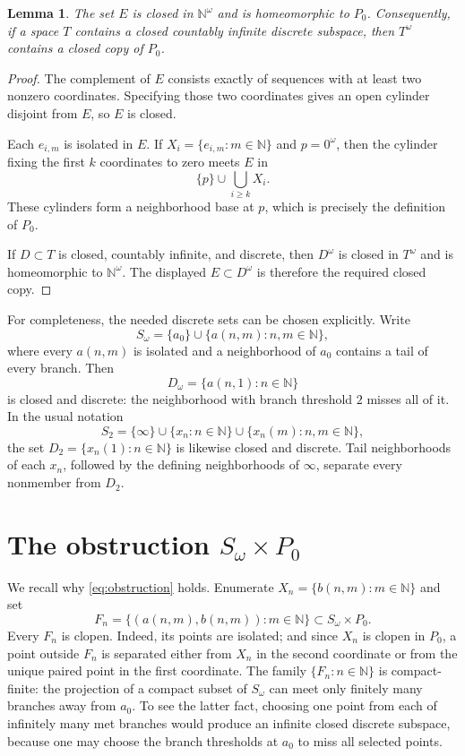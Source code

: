 \documentclass[11pt]{article}
\newtheorem{lemma}[theorem]{Lemma}
\newcommand{\N}{\mathbb N}
\begin{document}
\begin{lemma}\label{lem:P0}
The set $E$ is closed in $\N^\omega$ and is homeomorphic to $P_0$.
Consequently, if a space $T$ contains a closed countably infinite discrete
subspace, then $T^\omega$ contains a closed copy of $P_0$.
\end{lemma}

\begin{proof}
The complement of $E$ consists exactly of sequences with at least two
nonzero coordinates.  Specifying those two coordinates gives an open
cylinder disjoint from $E$, so $E$ is closed.

Each $e_{i,m}$ is isolated in $E$.  If
$X_i=\{e_{i,m}:m\in\N\}$ and $p=0^\omega$, then the cylinder fixing the
first $k$ coordinates to zero meets $E$ in
\[
 \{p\}\cup\bigcup_{i\ge k}X_i.
\]
These cylinders form a neighborhood base at $p$, which is precisely the
definition of $P_0$.

If $D\subset T$ is closed, countably infinite, and discrete, then
$D^\omega$ is closed in $T^\omega$ and is homeomorphic to $\N^\omega$.
The displayed $E\subset D^\omega$ is therefore the required closed copy.
\end{proof}

For completeness, the needed discrete sets can be chosen explicitly.  Write
\[
 S_\omega=\{a_0\}\cup\{a(n,m):n,m\in\N\},
\]
where every $a(n,m)$ is isolated and a neighborhood of $a_0$ contains a
tail of every branch.  Then
\[
       D_\omega=\{a(n,1):n\in\N\}
\]
is closed and discrete: the neighborhood with branch threshold $2$
misses all of it.  In the usual notation
\[
 S_2=\{\infty\}\cup\{x_n:n\in\N\}
       \cup\{x_n(m):n,m\in\N\},
\]
the set $D_2=\{x_n(1):n\in\N\}$ is likewise closed and discrete.  Tail
neighborhoods of each $x_n$, followed by the defining neighborhoods of
$\infty$, separate every nonmember from $D_2$.

\section{\texorpdfstring{\hspace{0.35em}}{}The obstruction \texorpdfstring{$S_\omega\times P_0$}{Somega x P0}}

We recall why \eqref{eq:obstruction} holds.  Enumerate
$X_n=\{b(n,m):m\in\N\}$ and set
\[
 F_n=\{(a(n,m),b(n,m)):m\in\N\}\subset S_\omega\times P_0.
\]
Every $F_n$ is clopen.  Indeed, its points are isolated; and since $X_n$ is
clopen in $P_0$, a point outside $F_n$ is separated either from $X_n$ in
the second coordinate or from the unique paired point in the first
coordinate.  The family $\{F_n:n\in\N\}$ is
compact-finite: the projection of a compact subset of $S_\omega$ can meet
only finitely many branches away from $a_0$.  To see the latter fact,
choosing one point from each of infinitely many met branches would produce
an infinite closed discrete subspace, because one may choose the branch
thresholds at $a_0$ to miss all selected points.
\end{document}
